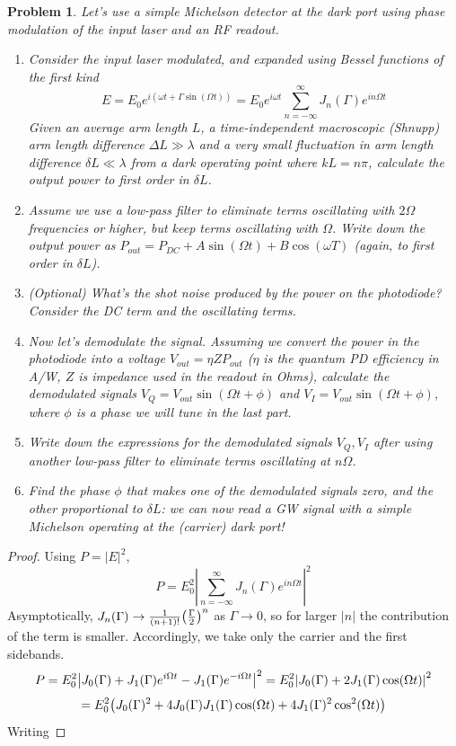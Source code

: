 \documentclass{article}
\newtheorem{plm}{Problem}
\begin{document}
\begin{plm}
  Let's use a simple Michelson detector at the dark port using phase modulation of the input laser and an RF readout.
  \begin{enumerate}
  \item Consider the input laser modulated, and expanded using Bessel functions of the first kind
    \[
      E = E_{0}e^{i(\omega t + \Gamma \sin(\Omega t))} = E_{0}e^{i\omega t}\sum_{n = -\infty}^{\infty}J_{n}(\Gamma)e^{in\Omega t}
    \]
    Given an average arm length $L$, a time-independent macroscopic (Shnupp) arm length difference $\Delta L \gg \lambda$
    and a very small fluctuation in arm length difference $\delta L \ll \lambda$ from a dark operating point where $kL = n\pi$,
    calculate the output power to first order in $\delta L$.
  \item Assume we use a low-pass filter to eliminate terms oscillating with $2\Omega$ frequencies or higher,
    but keep terms oscillating with $\Omega$.
    Write down the output power as $P_{out} = P_{DC} + A\sin(\Omega t) + B\cos(\omega T)$ (again, to first order in $\delta L$).
  \item (Optional) What's the shot noise produced by the power on the photodiode?
    Consider the DC term and the oscillating terms.
  \item Now let's demodulate the signal.
    Assuming we convert the power in the photodiode into a voltage $V_{out} = \eta ZP_{out}$
    ($\eta$ is the quantum PD efficiency in \si{A/W}, $Z$ is impedance used in the readout in Ohms),
    calculate the demodulated signals $V_{Q} = V_{out}\sin(\Omega t + \phi)$ and $V_{I} = V_{out}\sin(\Omega t + \phi)$,
    where $\phi$ is a phase we will tune in the last part.
  \item Write down the expressions for the demodulated signals $V_{Q}, V_{I}$ after using another low-pass filter to eliminate terms
    oscillating at $n\Omega$.
  \item Find the phase $\phi$ that makes one of the demodulated signals zero, and the other proportional to $\delta L$:
    we can now read a GW signal with a simple Michelson operating at the (carrier) dark port!
  \end{enumerate}
\end{plm}

\begin{proof}
  Using $P = |E|^{2}$,
  \[
    P = E_{0}^{2}\left| \sum_{n = -\infty}^{\infty}J_{n}(\Gamma)e^{in\Omega t} \right|^{2}
  \]
  Asymptotically, $J_{n}(\Gamma) \to \frac{1}{(n + 1)!}\qty(\frac{\Gamma}{2})^{n}$ as $\Gamma \to 0$,
  so for larger $|n|$ the contribution of the term is smaller.
  Accordingly, we take only the carrier and the first sidebands.
  \[
    P = E_{0}^{2}\qty|J_{0}(\Gamma) + J_{1}(\Gamma)e^{i\Omega t} - J_{1}(\Gamma)e^{-i\Omega t}|^{2}
    = E_{0}^{2}\qty|J_{0}(\Gamma) + 2J_{1}(\Gamma)\cos(\Omega t)|^{2}
  \]
  \[
    = E_{0}^{2}\qty(J_{0}(\Gamma)^{2} + 4J_{0}(\Gamma)J_{1}(\Gamma)\cos(\Omega t) + 4J_{1}(\Gamma)^{2}\cos^{2}(\Omega t))
  \]
  Writing
\end{proof}
\end{document}
